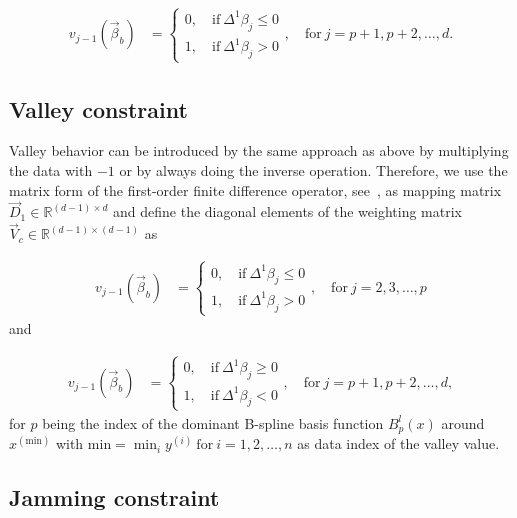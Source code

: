 \begin{align}\label{eq:v_peak_2}
	v_{j-1}(\vec{\beta}_b) &= \begin{cases} 
		0, \quad \text{if} \ \Delta^1\beta_j \le 0 \\ 
		1, \quad \text{if} \ \Delta^1\beta_j > 0
	\end{cases}, \quad \text{for} \ j=p+1,p+2,\dots,d.
\end{align}
%
\subsection{Valley constraint} \label{subsec:ValleyC}

Valley behavior can be introduced by the same approach as above by multiplying the data with $-1$ or by always doing the inverse operation. Therefore, we use the matrix form of the first-order finite difference operator, see~, as mapping matrix $\vec{D}_1 \in \mathbb{R}^{(d-1) \times d}$ and define the diagonal elements of the weighting matrix $\vec{V}_c \in \mathbb{R}^{(d-1) \times (d-1)}$ as

\begin{align}\label{eq:v_valley_1}
	v_{j-1}(\vec{\beta}_b) &= \begin{cases} 
		0, \quad \text{if} \ \Delta^1\beta_j \le 0 \\ 
		1, \quad \text{if} \ \Delta^1\beta_j > 0
	\end{cases}, \quad \text{for} \ j=2,3,\dots,p
\end{align}
%
and 

\begin{align}\label{eq:v_valley_2}
	v_{j-1}(\vec{\beta}_b) &= \begin{cases} 
		0, \quad \text{if} \ \Delta^1\beta_j \ge 0 \\ 
		1, \quad \text{if} \ \Delta^1\beta_j < 0
	\end{cases}, \quad \text{for} \  j=p+1,p+2,\dots,d,
\end{align}
%
for $p$ being the index of the dominant B-spline basis function $B_p^l(x)$ around $x^{(\text{min})}$ with $\text{min} = \min_i y^{(i)} \ \text{for} \ i=1,2,\dots,n$ as data index of the valley value. 

\subsection{Jamming constraint} \label{subsec:JammC}

